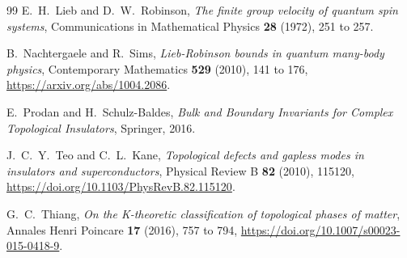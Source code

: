 \documentclass[12pt]{article}
\theoremstyle{definition}
\theoremstyle{remark}
\begin{document}
\begin{thebibliography}{99}
E.~H.~Lieb and D.~W.~Robinson,
\emph{The finite group velocity of quantum spin systems},
Communications in Mathematical Physics \textbf{28} (1972), 251 to 257.

B.~Nachtergaele and R.~Sims,
\emph{Lieb-Robinson bounds in quantum many-body physics},
Contemporary Mathematics \textbf{529} (2010), 141 to 176,
\url{https://arxiv.org/abs/1004.2086}.

E.~Prodan and H.~Schulz-Baldes,
\emph{Bulk and Boundary Invariants for Complex Topological Insulators},
Springer, 2016.

J.~C.~Y.~Teo and C.~L.~Kane,
\emph{Topological defects and gapless modes in insulators and superconductors},
Physical Review B \textbf{82} (2010), 115120,
\url{https://doi.org/10.1103/PhysRevB.82.115120}.

G.~C.~Thiang,
\emph{On the K-theoretic classification of topological phases of matter},
Annales Henri Poincare \textbf{17} (2016), 757 to 794,
\url{https://doi.org/10.1007/s00023-015-0418-9}.

\end{thebibliography}
\end{document}
